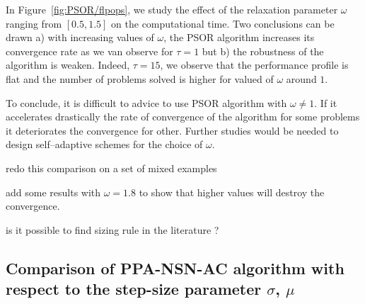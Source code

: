 In Figure~\ref{fig:PSOR/flpops}, we study the effect of the relaxation parameter $\omega$ ranging from $[0.5,1.5]$ on the computational time.  Two conclusions can be drawn a) with increasing values of $\omega$, the PSOR algorithm increases its convergence rate as we van observe for $\tau=1$ but b) the robustness of the algorithm is weaken. Indeed, $\tau=15$, we observe that the performance profile is flat and the number of problems solved is higher for valued of $\omega$ around $1$.

To conclude, it is difficult to advice to use PSOR algorithm with $\omega\neq 1$. If it accelerates drastically the rate of convergence of the algorithm for some problems it deteriorates the convergence for other. Further studies would be needed to design self--adaptive schemes for the choice of $\omega$.

\begin{ndrva}
  \item redo this comparison on a set of mixed examples
  \item add some results with $\omega =1.8$ to show that higher values will destroy the convergence.
  \item is it possible to find sizing rule in the literature ?
\end{ndrva}



\subsection{Comparison of PPA-NSN-AC algorithm with respect to  the step-size parameter $\sigma$, $\mu$}

